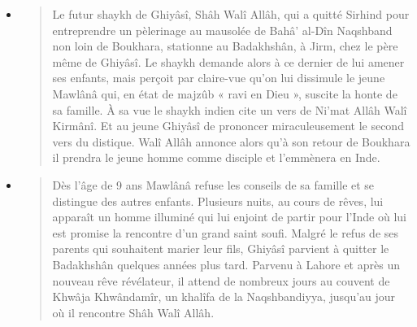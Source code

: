 \begin{itemize}
\item
  \begin{quote}
  Le futur shaykh de Ghiyâsî, Shâh Walî Allâh, qui a quitté Sirhind pour
  entreprendre un pèlerinage au mausolée de Bahâ' al-Dîn Naqshband non
  loin de Boukhara, stationne au Badakhshân, à Jirm, chez le père même
  de Ghiyâsî. Le shaykh demande alors à ce dernier de lui amener ses
  enfants, mais perçoit par claire-vue qu'on lui dissimule le jeune
  Mawlânâ qui, en état de majzûb « ravi en Dieu », suscite la honte de
  sa famille. À sa vue le shaykh indien cite un vers de Ni'mat Allâh
  Walî Kirmânî. Et au jeune Ghiyâsî de prononcer miraculeusement le
  second vers du distique. Walî Allâh annonce alors qu'à son retour de
  Boukhara il prendra le jeune homme comme disciple et l'emmènera en
  Inde.
  \end{quote}
\item
  \begin{quote}
  Dès l'âge de 9 ans Mawlânâ refuse les conseils de sa famille et se
  distingue des autres enfants. Plusieurs nuits, au cours de rêves, lui
  apparaît un homme illuminé qui lui enjoint de partir pour l'Inde où
  lui est promise la rencontre d'un grand saint soufi. Malgré le refus
  de ses parents qui souhaitent marier leur fils, Ghiyâsî parvient à
  quitter le Badakhshân quelques années plus tard. Parvenu à Lahore et
  après un nouveau rêve révélateur, il attend de nombreux jours au
  couvent de Khwâja Khwândamîr, un khalîfa de la Naqshbandiyya, jusqu'au
  jour où il rencontre Shâh Walî Allâh.
  \end{quote}
\end{itemize}

